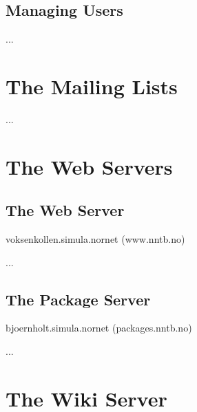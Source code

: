\subsection{Managing Users}

...



\section{The Mailing Lists}

...


\section{The Web Servers}

\subsection{The  Web Server}

voksenkollen.simula.nornet (www.nntb.no)

...


\subsection{The  Package Server}

bjoernholt.simula.nornet (packages.nntb.no)

...


\section{The Wiki Server}

